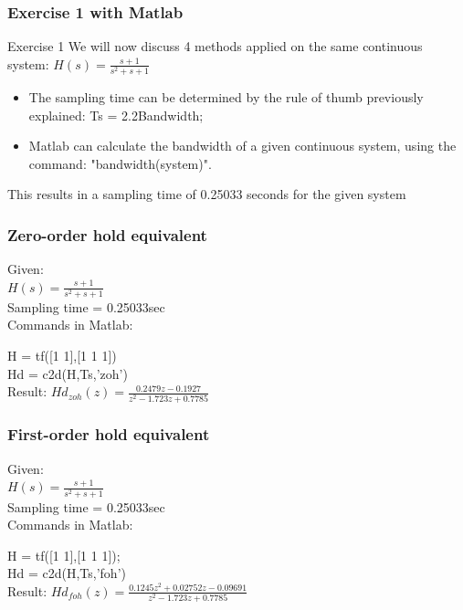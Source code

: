 \begin{frame}
	\frametitle{Exercise 1 with Matlab}
	\begin{block}{Exercise 1}
		We will now discuss 4 methods applied on the same continuous system:
		$H(s) = \frac{s + 1}{s^{2} + s + 1}$\\
		\begin{itemize}
		\item The sampling time can be determined by the rule of thumb previously explained: Ts = 2.2Bandwidth;
		\item Matlab can calculate the bandwidth of a given continuous system, using the command: "bandwidth(system)".
		\end{itemize}
		This results in a sampling time of 0.25033 seconds for the given system
	\end{block}
\end{frame}

\begin{frame}
	\frametitle{Zero-order hold equivalent}
	\begin{example}
		Given:\\
		$H(s) = \frac{s + 1}{s^{2} + s + 1}$\\
		Sampling time = 0.25033sec\\
		\vspace{0.8em}
		Commands in Matlab:
		
		H = tf([1 1],[1 1 1]) \\
		Hd = c2d(H,Ts,'zoh')\\
		\vspace{0.8em}
		Result:
		$Hd_{zoh}(z) = \frac{0.2479z - 0.1927}{z^{2} -1.723z + 0.7785}$
	\end{example}
\end{frame}

\begin{frame}
	\frametitle{First-order hold equivalent}
	\begin{example}
		Given:\\
		$H(s) = \frac{s + 1}{s^{2} + s + 1}$\\
		Sampling time = 0.25033sec\\
		\vspace{1em}
		Commands in Matlab:
	
		H = tf([1 1],[1 1 1]); \\
		Hd = c2d(H,Ts,'foh')\\
		\vspace{1em}
		Result:
		$Hd_{foh}(z) = \frac{0.1245z^{2} + 0.02752z - 0.09691}{z^{2} - 1.723z + 0.7785}$
	\end{example}
\end{frame}

